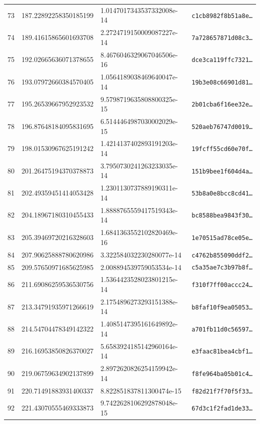\documentclass[11pt]{article}
\begin{document}
\begin{center}
\begin{longtable}{rlll}
73 & 187.22892258350185199 & 1.0147017343537332008e-14 & \texttt{c1cb8982f8b51a8e\dots} \\
74 & 189.41615865601693708 & 2.2724719150009087227e-14 & \texttt{7a728657871d08c3\dots} \\
75 & 192.02665636071378655 & 8.4676046329067046506e-16 & \texttt{dce3ca119ffc7321\dots} \\
76 & 193.07972660384570405 & 1.0564189038469640047e-14 & \texttt{19b3e08c66901d81\dots} \\
77 & 195.26539667952923532 & 9.5798719635808800325e-15 & \texttt{2b01cba6f16ee32e\dots} \\
78 & 196.87648184095831695 & 6.5144464987030002029e-15 & \texttt{520aeb76747d0019\dots} \\
79 & 198.01530967625191242 & 1.4214137402893191203e-14 & \texttt{19fcff55cd60e70f\dots} \\
80 & 201.26475194370378873 & 3.7950730241263233035e-14 & \texttt{151b9bee1f604d4a\dots} \\
81 & 202.49359451414053428 & 1.2301130737889190311e-14 & \texttt{53b8a0e8bcc8cd41\dots} \\
82 & 204.18967180310455433 & 1.8888765559417519343e-14 & \texttt{bc8588bea9843f30\dots} \\
83 & 205.39469720216328603 & 1.6841363552102820469e-16 & \texttt{1e70515ad78ce05e\dots} \\
84 & 207.90625888780620986 & 3.322584032230280077e-14 & \texttt{c4762b855090ddf2\dots} \\
85 & 209.57650971685625985 & 2.008894539759053534e-14 & \texttt{c5a35ae7c3b97b8f\dots} \\
86 & 211.69086259536530756 & 1.5364423528023801215e-14 & \texttt{f310f7ff00accc24\dots} \\
87 & 213.34791935971266619 & 2.1754896273293151388e-14 & \texttt{b8faf10f9ea05053\dots} \\
88 & 214.54704478349142322 & 1.4085147395161649892e-14 & \texttt{a701fb11d0c56597\dots} \\
89 & 216.16953850826370027 & 5.6583924185142960164e-14 & \texttt{e3faac81bea4cbf1\dots} \\
90 & 219.06759634902137899 & 2.8972620826254159942e-14 & \texttt{f8fe964ba05b01c4\dots} \\
91 & 220.71491883931400337 & 8.822851837811300474e-15 & \texttt{f82d21f7f70f5f33\dots} \\
92 & 221.43070555469333873 & 9.7422628106292878048e-15 & \texttt{67d3c1f2fad1de33\dots} \\

\end{longtable}
\end{center}
\end{document}
